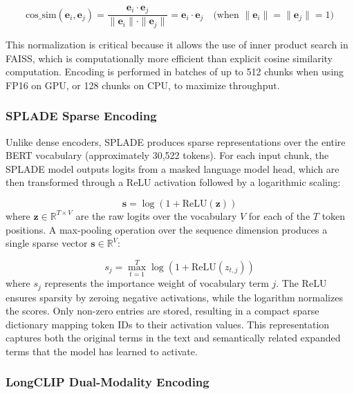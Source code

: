 \begin{equation}
    \text{cos\_sim}(\mathbf{e}_i, \mathbf{e}_j) = \frac{\mathbf{e}_i \cdot \mathbf{e}_j}{\|\mathbf{e}_i\| \cdot \|\mathbf{e}_j\|} = \mathbf{e}_i \cdot \mathbf{e}_j \quad \text{(when } \|\mathbf{e}_i\| = \|\mathbf{e}_j\| = 1\text{)}
\end{equation}

This normalization is critical because it allows the use of inner product search in FAISS, which is computationally more efficient than explicit cosine similarity computation. Encoding is performed in batches of up to 512 chunks when using FP16 on GPU, or 128 chunks on CPU, to maximize throughput.

\subsubsection{SPLADE Sparse Encoding}

Unlike dense encoders, SPLADE produces sparse representations over the entire BERT vocabulary (approximately 30,522 tokens). For each input chunk, the SPLADE model outputs logits from a masked language model head, which are then transformed through a ReLU activation followed by a logarithmic scaling:

\begin{equation}
    \mathbf{s} = \log(1 + \text{ReLU}(\mathbf{z}))
\end{equation}
where $\mathbf{z} \in \mathbb{R}^{T \times V}$ are the raw logits over the vocabulary $V$ for each of the $T$ token positions. A max-pooling operation over the sequence dimension produces a single sparse vector $\mathbf{s} \in \mathbb{R}^{V}$:

\begin{equation}
    s_j = \max_{t=1}^{T} \log(1 + \text{ReLU}(z_{t,j}))
\end{equation}
where $s_j$ represents the importance weight of vocabulary term $j$. The ReLU ensures sparsity by zeroing negative activations, while the logarithm normalizes the scores. Only non-zero entries are stored, resulting in a compact sparse dictionary mapping token IDs to their activation values. This representation captures both the original terms in the text and semantically related expanded terms that the model has learned to activate.

\subsubsection{LongCLIP Dual-Modality Encoding}

